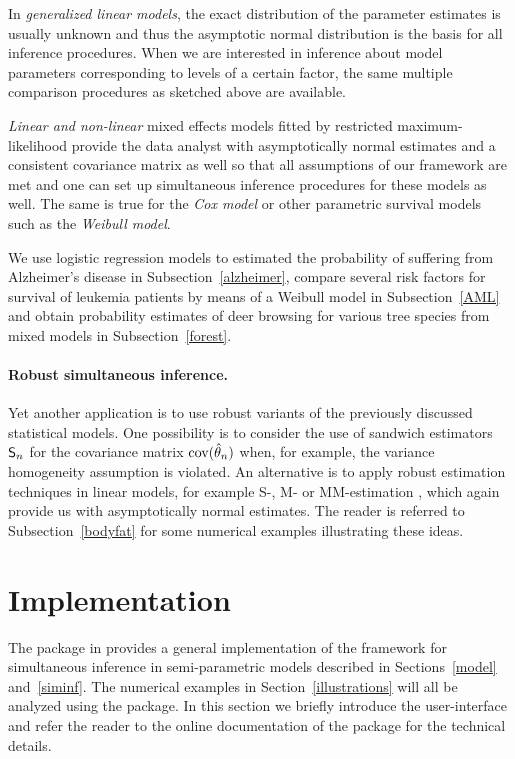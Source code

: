 \documentclass[12pt,a4paper]{article}
\begin{document}
In \emph{generalized linear models}, the exact distribution of the parameter
estimates is usually unknown and thus the asymptotic normal distribution is
the basis for all inference procedures. When we are interested in inference
about model parameters corresponding to levels of a certain factor, the same
multiple comparison procedures as sketched above are available. 

\emph{Linear and non-linear} mixed effects models fitted by restricted
maximum-likelihood provide the data analyst with asymptotically normal
estimates and a consistent
covariance matrix as well so that all assumptions of our framework are met
and one can set up simultaneous inference procedures for these models as
well. The same is true for the \emph{Cox model} or other parametric survival
models such as the \emph{Weibull model}.

We use logistic regression models to estimated the probability of suffering
from Alzheimer's disease in Subsection~\ref{alzheimer}, compare several risk
factors for survival of leukemia patients by means of a Weibull model in
Subsection~\ref{AML} and obtain probability estimates of deer browsing for
various tree species from mixed models in Subsection~\ref{forest}.

\paragraph{Robust simultaneous inference.}

Yet another application is to use robust variants of the previously
discussed statistical models. One possibility is to consider the use of
sandwich estimators $\textsf{S}_n$ for the covariance matrix
$\text{cov}(\hat{\theta}_n)$ when,
for example, the variance homogeneity assumption is violated. An alternative
is to apply robust estimation techniques in linear models, for example S-,
M- or MM-estimation 
\citep[see][for
example]{RousseeuwLeroy2003, mfluc:Stefanski+Boos:2002, Yohai1987, mfluc:White:1994}, 
which again provide us with asymptotically normal estimates.
The reader is referred to Subsection~\ref{bodyfat} for some numerical
examples illustrating these ideas.

\section{Implementation}

\label{implementation}

The  package \citep{pkg:multcomp} in \RR{} \citep{rcore2007}
provides a general implementation of the framework for simultaneous
inference in semi-parametric models described in Sections~\ref{model}
and~\ref{siminf}. The numerical examples in Section~\ref{illustrations} will
all be analyzed using the  package. In this section we
briefly introduce the user-interface and refer the reader to
the online documentation of the package for the technical details.
\end{document}
